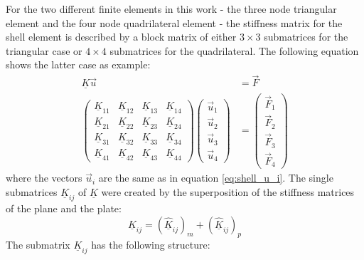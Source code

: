  For the two different finite elements in this work - the three node triangular element and the four node quadrilateral element - the stiffness matrix for the shell element is described by a block matrix of either $3\!\times\!3$ submatrices for the triangular case or $4\!\times\!4$ submatrices for the quadrilateral. The following equation shows the latter case as example:
 \begin{align}\label{eq:shell_K_ij}
 \underline{K} \vec{u} &= \vec{F} \nonumber\\
 \begin{pmatrix}
 \underline{K}_{11} & \underline{K}_{12} & \underline{K}_{13} & \underline{K}_{14}\\
 \underline{K}_{21} & \underline{K}_{22} & \underline{K}_{23} & \underline{K}_{24}\\
 \underline{K}_{31} & \underline{K}_{32} & \underline{K}_{33} & \underline{K}_{34}\\
 \underline{K}_{41} & \underline{K}_{42} & \underline{K}_{43} & \underline{K}_{44}
 \end{pmatrix} \begin{pmatrix}
 \vec{u}_1 \\\vec{u}_2 \\\vec{u}_3\\\vec{u}_4
 \end{pmatrix} &= \begin{pmatrix}
 \vec{F}_1\\\vec{F}_2\\\vec{F}_3\\\vec{F}_4
 \end{pmatrix}
 \end{align}
 where the vectors $\vec{u}_i$ are the same as in equation \ref{eq:shell_u_i}. The single submatrices $\underline{K}_{ij}$ of $\underline{K}$ were created by the superposition of the stiffness matrices of the plane and the plate:
 \begin{equation}
 \underline{K}_{ij} = \left(\underline{\hat{K}}_{ij}\right)_m + \left(\underline{\hat{K}}_{ij}\right)_p
 \end{equation}
 The submatrix $\underline{K}_{ij}$ has the following structure:
